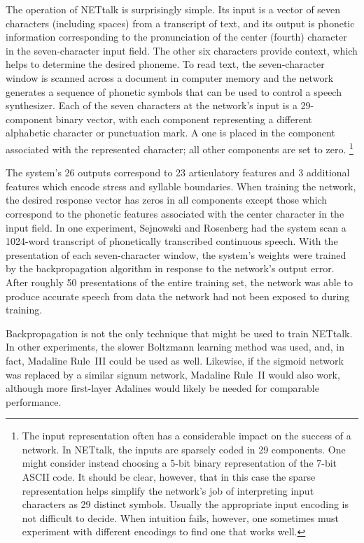 \documentclass[10pt,twocolumn]{article}
\begin{document}
The operation of NETtalk is surprisingly simple. Its input is a vector of seven
characters (including spaces) from a transcript of text, and its output is
phonetic information corresponding to the pronunciation of the center (fourth)
character in the seven-character input field. The other six characters provide
context, which helps to determine the desired phoneme. To read text, the
seven-character window is scanned across a document in computer memory and the
network generates a sequence of phonetic symbols that can be used to control a
speech synthesizer. Each of the seven characters at the network's input is a
29-component binary vector, with each component representing a different
alphabetic character or punctuation mark. A one is placed in the component
associated with the represented character; all other components are set to
zero.%
\footnote{The input representation often has a considerable impact on the success
of a network. In NETtalk, the inputs are sparsely coded in 29 components. One
might consider instead choosing a 5-bit binary representation of the 7-bit ASCII
code. It should be clear, however, that in this case the sparse representation
helps simplify the network's job of interpreting input characters as 29 distinct
symbols. Usually the appropriate input encoding is not difficult to decide. When
intuition fails, however, one sometimes must experiment with different encodings
to find one that works well.}

The system's 26 outputs correspond to 23 articulatory features and 3 additional
features which encode stress and syllable boundaries. When training the network,
the desired response vector has zeros in all components except those which
correspond to the phonetic features associated with the center character in the
input field. In one experiment, Sejnowski and Rosenberg had the system scan a
1024-word transcript of phonetically transcribed continuous speech. With the
presentation of each seven-character window, the system's weights were trained by
the backpropagation algorithm in response to the network's output error. After
roughly 50 presentations of the entire training set, the network was able to
produce accurate speech from data the network had not been exposed to during
training.

Backpropagation is not the only technique that might be used to train NETtalk. In
other experiments, the slower Boltzmann learning method was used, and, in fact,
Madaline Rule~III could be used as well. Likewise, if the sigmoid network was
replaced by a similar signum network, Madaline Rule~II would also work, although
more first-layer Adalines would likely be needed for comparable performance.
\end{document}
